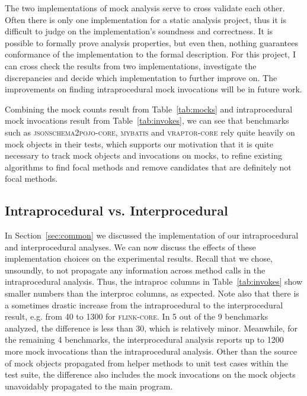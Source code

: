 The two implementations of mock analysis serve to cross validate each other. Often there is only one implementation for a static analysis project, thus it is difficult to judge on the implementation's soundness and correctness. It is possible to formally prove analysis properties, but even then, nothing guarantees conformance of the implementation to the formal description. For this project, I can cross check the results from two implementations, investigate the discrepancies and decide which implementation to further improve on. The improvements on finding intraprocedural mock invocations will be in future work.

Combining the mock counts result from Table~\ref{tab:mocks} and intraprocedural mock invocations result from Table~\ref{tab:invokes}, we can see that benchmarks such as \textsc{jsonschema2pojo-core}, \textsc{mybatis} and \textsc{vraptor-core} rely quite heavily on mock objects in their tests, which supports our motivation that it is quite necessary to track mock objects and invocations on mocks, to refine existing algorithms to find focal methods and remove candidates that are definitely not focal methods. 


\subsection{Intraprocedural vs. Interprocedural}

In Section~\ref{sec:common} we discussed the implementation of our intraprocedural and interprocedural analyses. We can now discuss the effects of these implementation choices on the experimental results. Recall that we chose, unsoundly, to not propagate any information across method calls in the intraprocedural analysis. Thus, the intraproc columns in Table~\ref{tab:invokes} show smaller numbers than the interproc columns, as expected. Note also that there is a sometimes drastic increase from the intraprocedural to the interprocedural result, e.g. from 40 to 1300 for \textsc{flink-core}. In 5 out of the 9 benchmarks analyzed, the difference is less than 30, which is relatively minor. Meanwhile, for the remaining 4 benchmarks, the interprocedural analysis reports up to 1200 more mock invocations than the intraprocedural analysis. Other than the source of mock objects propagated from helper methods to unit test cases within the test suite, the difference also includes the mock invocations on the mock objects unavoidably propagated to the main program. 

